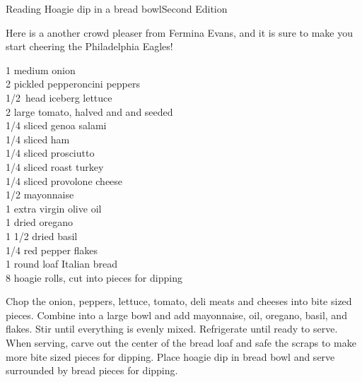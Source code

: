 \begin{entry}{Reading Hoagie dip in a bread bowl}{Second Edition}

\begin{open}
  Here is a another crowd pleaser from Fermina Evans, and it is sure to make
  you start cheering the Philadelphia Eagles!
\end{open}

\begin{ingredients}
    1 medium onion\\
    2 pickled pepperoncini peppers\\
    \SI{1/2}{head} iceberg lettuce\\
    2 large tomato, halved and and seeded\\
    \SI{1/4}{\pound} sliced genoa salami\\
    \SI{1/4}{\pound} sliced ham\\
    \SI{1/4}{\pound} sliced prosciutto\\
    \SI{1/4}{\pound} sliced roast turkey\\
    \SI{1/4}{\pound} sliced provolone cheese\\
    \SI{1/2}{\cup} mayonnaise\\
    \SI{1}{\tblspoon} extra virgin olive oil\\
    \SI{1}{\teaspoon} dried oregano\\
    1 \SI{1/2}{\teaspoon} dried basil\\
    \SI{1/4}{\teaspoon} red pepper flakes\\
    1 round loaf Italian bread\\
    8 hoagie rolls, cut into pieces for dipping
\end{ingredients}
%
%
Chop the onion, peppers, lettuce, tomato, deli meats and cheeses into bite
sized pieces. Combine into a large bowl and add mayonnaise, oil, oregano,
basil, and flakes. Stir until everything is evenly mixed. Refrigerate until
ready to serve. When serving, carve out the center of the bread loaf and safe
the scraps to make more bite sized pieces for dipping. Place hoagie dip in
bread bowl and serve surrounded by bread pieces for dipping.
\end{entry}


